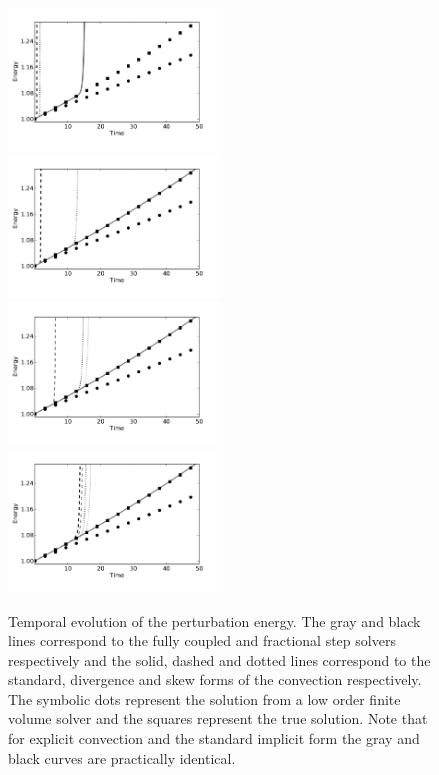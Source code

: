 \begin{figure}
\includegraphics[width=0.5\textwidth]{chapters/mortensen/pdf/OS_energy_cfl_0_1_model_1.pdf}
\includegraphics[width=0.5\textwidth]{chapters/mortensen/pdf/OS_energy_cfl_0_1_model_0.pdf}
\includegraphics[width=0.5\textwidth]{chapters/mortensen/pdf/OS_energy_cfl_0_05_model_1.pdf}
\includegraphics[width=0.5\textwidth]{chapters/mortensen/pdf/OS_energy_cfl_0_05_model_0.pdf}
 \caption{ Temporal evolution of the perturbation energy. The gray and black lines correspond to the fully coupled and fractional step solvers respectively and the solid, dashed and dotted lines correspond to the standard, divergence and skew forms of the convection respectively. The symbolic dots represent the solution from a low order finite volume solver and the squares represent the true solution. Note that for explicit convection and the standard implicit form the gray and black curves are practically identical. }
\label{fig:mortensen:OS_long_time}
\end{figure}

